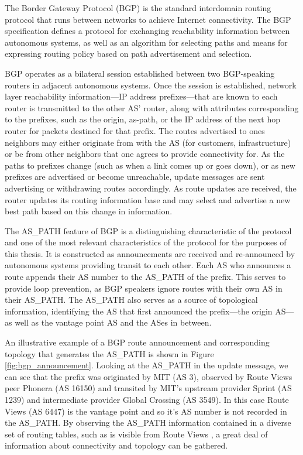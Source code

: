 The Border Gateway Protocol (BGP) is the standard interdomain routing protocol that runs between networks to achieve Internet connectivity. The BGP specification defines a protocol for exchanging reachability information between autonomous systems, as well as an algorithm for selecting paths and means for expressing routing policy based on path advertisement and selection.

BGP operates as a bilateral session established between two BGP-speaking routers in adjacent autonomous systems. Once the session is established, network layer reachability information---IP address prefixes---that are known to each router is transmitted to the other AS' router, along with attributes corresponding to the prefixes, such as the origin, as-path, or the IP address of the next hop router for packets destined for that prefix. The routes advertised to ones neighbors may either originate from with the AS (for customers, infrastructure) or be from  other neighbors that one agrees to provide connectivity for. As the paths to prefixes change (such as when a link comes up or goes down), or as new prefixes are advertised or become unreachable, update messages are sent advertising or withdrawing routes accordingly. As route updates are received, the router updates its routing information base and may select and advertise a new best path based on this change in information.

The AS\_PATH feature of BGP is a distinguishing characteristic of the protocol and one of the most relevant characteristics of the protocol for the purposes of this thesis. It is constructed as announcements are received and re-announced by autonomous systems providing transit to each other. Each AS who announces a route appends their AS number to the AS\_PATH of the prefix. This serves to provide loop prevention, as BGP speakers ignore routes with their own AS in their AS\_PATH. The AS\_PATH also serves as a source of topological information, identifying the AS that first announced the prefix---the origin AS---as well as the vantage point AS and the ASes in between.

 An illustrative example of a BGP route announcement and corresponding topology that generates the AS\_PATH is shown in Figure \ref{fig:bgp_announcement}. Looking at the AS\_PATH in the update message, we can see that the prefix was originated by MIT (AS 3), observed by Route Views peer Phonera (AS 16150) and transited by MIT's upstream provider Sprint (AS 1239) and intermediate provider Global Crossing (AS 3549). In this case Route Views (AS 6447) is the vantage point and so it's AS number is not recorded in the AS\_PATH. By observing the AS\_PATH information contained in a diverse set of routing tables, such as is visible from Route Views \cite{Routeviews}, a great deal of information about connectivity and topology can be gathered. 

